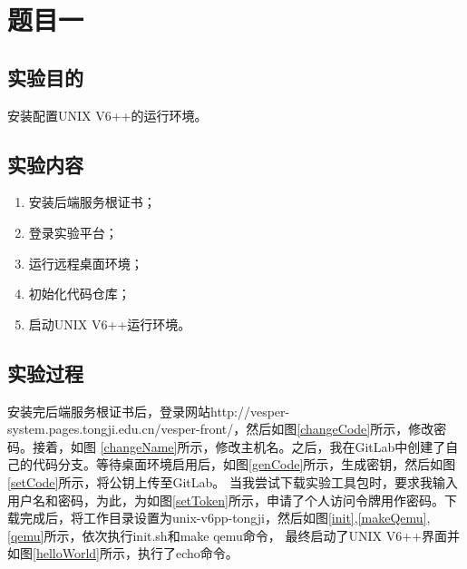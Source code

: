 \section{题目一}
\subsection{实验目的}
安装配置UNIX V6++的运行环境。
\subsection{实验内容}
\begin{enumerate}
    \item 安装后端服务根证书；
    \item 登录实验平台；
    \item  运行远程桌面环境；
    \item 初始化代码仓库；
    \item 启动UNIX V6++运行环境。
\end{enumerate}
\subsection{实验过程}
安装完后端服务根证书后，登录网站http://vesper-system.pages.tongji.edu.cn/vesper-front/，然后如图\ref{changeCode}所示，修改密码。接着，如图
\ref{changeName}所示，修改主机名。之后，我在GitLab中创建了自己的代码分支。等待桌面环境启用后，如图\ref{genCode}所示，生成密钥，然后如图\ref{setCode}所示，将公钥上传至GitLab。
当我尝试下载实验工具包时，要求我输入用户名和密码，为此，为如图\ref{setToken}所示，申请了个人访问令牌用作密码。下载完成后，将工作目录设置为unix-v6pp-tongji，然后如图\ref{init},\ref{makeQemu},\ref{qemu}所示，依次执行init.sh和make qemu命令，
最终启动了UNIX V6++界面并如图\ref{helloWorld}所示，执行了echo命令。

